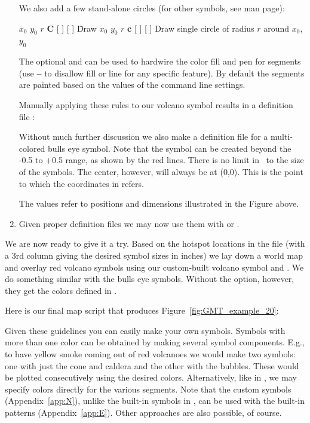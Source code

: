 \begin{enumerate}
We also add a few stand-alone circles (for other symbols, see  man page):

\begin{tabbing} 
$x_0$ $y_0$ $r$ {\bf C} [  ] [  ] \=Draw \kill
$x_0$ $y_0$ $r$ {\bf c} [  ] [  ] \> Draw
single circle of radius $r$ around $x_0$, $y_0$ \\
\end{tabbing} 

The optional  and  can be used to hardwire
the color fill and pen for segments (use {\bf --} to disallow
fill or line for any specific feature).  By default the segments
are painted based on the values of the command line settings.

Manually applying these rules to our volcano symbol results in a
definition file :


Without much further discussion we also make a definition file  for a multi-colored bulls eye symbol.
Note that the symbol can be created beyond the -0.5 to +0.5 range, as shown by the red lines. There is no limit in
\GMT\ to the size of the symbols. The center, however, will always be at (0,0). This is the point to which the
coordinates in  refers.


The values refer to positions and dimensions illustrated in the Figure above.

\item Given proper definition files we may now use them with  or .
\end{enumerate}

We are now ready to give it a try.  Based on the hotspot
locations in the file  (with a 3rd column
giving the desired symbol sizes in inches) we lay down a
world map and overlay red volcano symbols using our custom-built
volcano symbol and . We do something similar with the bulls eye symbols.
Without the  option, however, they get the colors defined in .

Here is our final map script that produces Figure~\ref{fig:GMT_example_20}:


Given these guidelines you can easily make your own symbols.
Symbols with more than one color can be obtained by making
several symbol components.  E.g., to have yellow smoke coming
out of red volcanoes we would make two symbols: one with just
the cone and caldera and the other with the bubbles.  These
would be plotted consecutively using the desired colors.
Alternatively, like in , we may
specify colors directly for the various segments.  Note that
the custom symbols (Appendix~\ref{app:N}), unlike the built-in symbols in \GMT, can
be used with the built-in patterns (Appendix~\ref{app:E}).  Other
approaches are also possible, of course.

